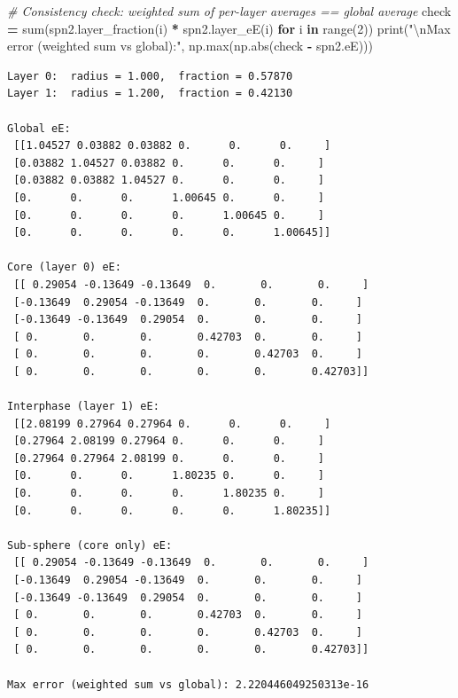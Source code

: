 \documentclass[
  a4paper,
  numbers=noendperiod,
  DIV=12]{scrreprt}
\newenvironment{Shaded}{\begin{snugshade}}{\end{snugshade}}
\newcommand{\BuiltInTok}[1]{#1}
\newcommand{\CharTok}[1]{\textcolor[rgb]{0.31,0.60,0.02}{#1}}
\newcommand{\CommentTok}[1]{\textcolor[rgb]{0.56,0.35,0.01}{\textit{#1}}}
\newcommand{\ControlFlowTok}[1]{\textcolor[rgb]{0.13,0.29,0.53}{\textbf{#1}}}
\newcommand{\DecValTok}[1]{\textcolor[rgb]{0.00,0.00,0.81}{#1}}
\newcommand{\KeywordTok}[1]{\textcolor[rgb]{0.13,0.29,0.53}{\textbf{#1}}}
\newcommand{\NormalTok}[1]{#1}
\newcommand{\OperatorTok}[1]{\textcolor[rgb]{0.81,0.36,0.00}{\textbf{#1}}}
\newcommand{\StringTok}[1]{\textcolor[rgb]{0.31,0.60,0.02}{#1}}
\begin{document}
\begin{Shaded}
\begin{Highlighting}[]
\CommentTok{\# Consistency check: weighted sum of per{-}layer averages == global average}
\NormalTok{check }\OperatorTok{=} \BuiltInTok{sum}\NormalTok{(spn2.layer\_fraction(i) }\OperatorTok{*}\NormalTok{ spn2.layer\_eE(i) }\ControlFlowTok{for}\NormalTok{ i }\KeywordTok{in} \BuiltInTok{range}\NormalTok{(}\DecValTok{2}\NormalTok{))}
\BuiltInTok{print}\NormalTok{(}\StringTok{"}\CharTok{\textbackslash{}n}\StringTok{Max error (weighted sum vs global):"}\NormalTok{, np.}\BuiltInTok{max}\NormalTok{(np.}\BuiltInTok{abs}\NormalTok{(check }\OperatorTok{{-}}\NormalTok{ spn2.eE)))}
\end{Highlighting}
\end{Shaded}

\begin{verbatim}
Layer 0:  radius = 1.000,  fraction = 0.57870
Layer 1:  radius = 1.200,  fraction = 0.42130

Global eE:
 [[1.04527 0.03882 0.03882 0.      0.      0.     ]
 [0.03882 1.04527 0.03882 0.      0.      0.     ]
 [0.03882 0.03882 1.04527 0.      0.      0.     ]
 [0.      0.      0.      1.00645 0.      0.     ]
 [0.      0.      0.      0.      1.00645 0.     ]
 [0.      0.      0.      0.      0.      1.00645]]

Core (layer 0) eE:
 [[ 0.29054 -0.13649 -0.13649  0.       0.       0.     ]
 [-0.13649  0.29054 -0.13649  0.       0.       0.     ]
 [-0.13649 -0.13649  0.29054  0.       0.       0.     ]
 [ 0.       0.       0.       0.42703  0.       0.     ]
 [ 0.       0.       0.       0.       0.42703  0.     ]
 [ 0.       0.       0.       0.       0.       0.42703]]

Interphase (layer 1) eE:
 [[2.08199 0.27964 0.27964 0.      0.      0.     ]
 [0.27964 2.08199 0.27964 0.      0.      0.     ]
 [0.27964 0.27964 2.08199 0.      0.      0.     ]
 [0.      0.      0.      1.80235 0.      0.     ]
 [0.      0.      0.      0.      1.80235 0.     ]
 [0.      0.      0.      0.      0.      1.80235]]

Sub-sphere (core only) eE:
 [[ 0.29054 -0.13649 -0.13649  0.       0.       0.     ]
 [-0.13649  0.29054 -0.13649  0.       0.       0.     ]
 [-0.13649 -0.13649  0.29054  0.       0.       0.     ]
 [ 0.       0.       0.       0.42703  0.       0.     ]
 [ 0.       0.       0.       0.       0.42703  0.     ]
 [ 0.       0.       0.       0.       0.       0.42703]]

Max error (weighted sum vs global): 2.220446049250313e-16
\end{verbatim}
\end{document}
